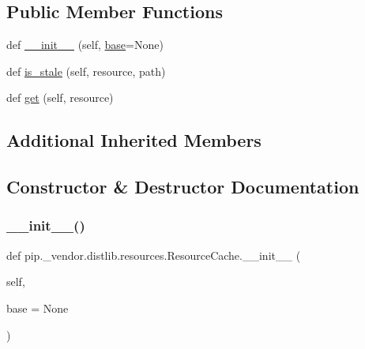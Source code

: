 \subsection*{Public Member Functions}
\begin{DoxyCompactItemize}
\item 
def \hyperlink{classpip_1_1__vendor_1_1distlib_1_1resources_1_1ResourceCache_a713fdc9b704f754d67b09f04cb2faf63}{\+\_\+\+\_\+init\+\_\+\+\_\+} (self, \hyperlink{classpip_1_1__vendor_1_1distlib_1_1util_1_1Cache_a8c4d3c27a776a3caeb0efa0db1b1d7da}{base}=None)
\item 
def \hyperlink{classpip_1_1__vendor_1_1distlib_1_1resources_1_1ResourceCache_ac9c96e1f685c2ffbf21c91a435ba6fae}{is\+\_\+stale} (self, resource, path)
\item 
def \hyperlink{classpip_1_1__vendor_1_1distlib_1_1resources_1_1ResourceCache_aae2e72bdd36045f6f2bea11c3cb683cd}{get} (self, resource)
\end{DoxyCompactItemize}
\subsection*{Additional Inherited Members}


\subsection{Constructor \& Destructor Documentation}
\mbox{\label{classpip_1_1__vendor_1_1distlib_1_1resources_1_1ResourceCache_a713fdc9b704f754d67b09f04cb2faf63}} 
\subsubsection{\texorpdfstring{\+\_\+\+\_\+init\+\_\+\+\_\+()}{\_\_init\_\_()}}
{\footnotesize\ttfamily def pip.\+\_\+vendor.\+distlib.\+resources.\+Resource\+Cache.\+\_\+\+\_\+init\+\_\+\+\_\+ (\begin{DoxyParamCaption}\item[{}]{self,  }\item[{}]{base = {\ttfamily None} }\end{DoxyParamCaption})}




